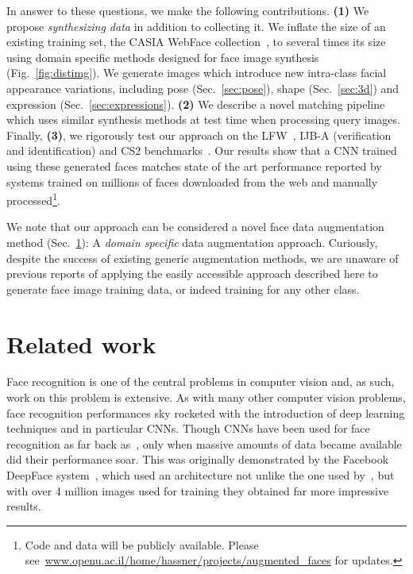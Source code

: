 \documentclass[runningheads]{llncs}
\newcommand{\minisection}[1]{\vspace{0.04in} \noindent {\bf #1:} }
\begin{document}
In answer to these questions, we make the following contributions. {\bf (1)} We propose {\em synthesizing data} in addition to collecting it. We inflate the size of an existing training set, the CASIA WebFace collection~\cite{yi2014learning}, to several times its size using domain specific methods designed for face image synthesis (Fig.~\ref{fig:distimg}). We generate images which introduce new intra-class facial appearance variations, including pose (Sec.~\ref{sec:pose}), shape (Sec.~\ref{sec:3d}) and expression (Sec.~\ref{sec:expressions}). {\bf (2)} We describe a novel matching pipeline which uses similar synthesis methods at test time when processing query images. Finally, {\bf (3)}, we rigorously test our approach on the LFW~\cite{LFWTech}, IJB-A (verification and identification) and CS2 benchmarks~\cite{klare2015pushing}. Our results show that a CNN trained using these generated faces matches state of the art performance reported by systems trained on millions of faces downloaded from the web and manually processed\footnote{Code and data will be publicly available. Please see~\url{www.openu.ac.il/home/hassner/projects/augmented_faces} for updates.}.

We note that our approach can be considered a novel face data augmentation method (Sec.~\ref{sec:related}): A {\em domain specific} data augmentation approach. Curiously, despite the success of existing generic augmentation methods, we are unaware of previous reports of applying the easily accessible approach described here to generate face image training data, or indeed training for any other class. 



\section{Related work}\label{sec:related}

\minisection{Face recognition} 
Face recognition is one of the central problems in computer vision and, as such, work on this problem is extensive. As with many other computer vision problems, face recognition performances sky rocketed with the introduction of deep learning techniques and in particular CNNs. Though CNNs have been used for face recognition as far back as~\cite{lawrence1997face}, only when massive amounts of data became available did their performance soar. This was originally demonstrated by the Facebook DeepFace system~\cite{taigman2014deepface}, which used an architecture not unlike the one used by~\cite{lawrence1997face}, but with over 4 million images used for training they obtained far more impressive results.  
\end{document}
